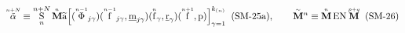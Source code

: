 \documentclass[preview]{standalone}
\begin{document}
\begin{align*}
\special{dvisvgm:raw <g id='unique000'>}\overset{\scriptscriptstyle n+N}{\tilde{\alpha}} \equiv \underset{n}{\overset{n+N}{\mathrm{S}}}\,\overset{\scriptscriptstyle n}{\mathbf{M}}\widetilde{\mathrm{a}}\Big[(\overset{\scriptscriptstyle n-1}{\Phi}_{j\gamma})(\overset{\scriptscriptstyle n-1}{\mathrm{f}}_{j\gamma},\underline{\mathrm{m}}_{j\gamma})(\overset{\scriptscriptstyle n}{\mathrm{f}}_\gamma,\underline{\mathrm{r}}_\gamma)(\overset{\scriptscriptstyle n+1}{\mathrm{f}},\mathrm{p})\Big]_{\gamma=1}^{k_{(n)}}\;\;(\text{SM-25a}), \qquad \overset{\scriptscriptstyle\sim}{\mathbf{M}}{}^n \equiv \overset{\scriptscriptstyle n}{\mathbf{M}}\,\mathrm{EN}\,\overset{\scriptscriptstyle p+q}{\mathbf{M}}\;\;(\text{SM-26})\special{dvisvgm:raw </g>}
\end{align*}
\end{document}
